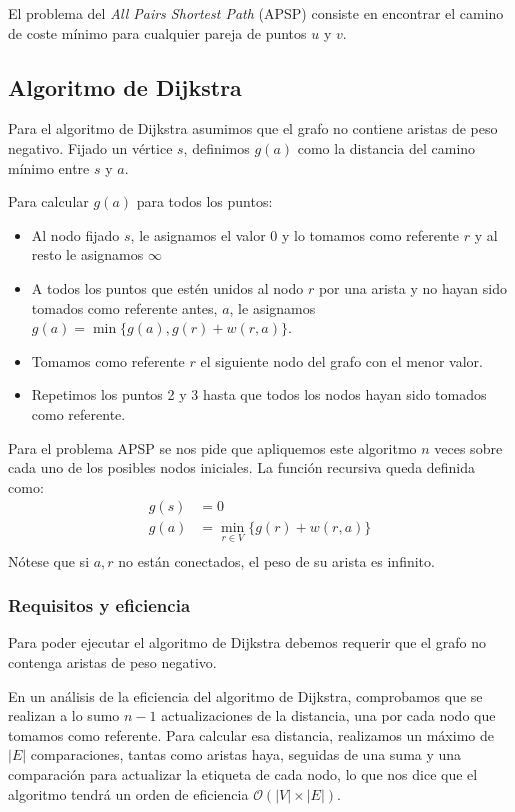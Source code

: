 \documentclass[a4paper, 11pt]{article} %
\begin{document}
    El problema del \textit{All Pairs Shortest Path} (APSP) consiste en encontrar el camino de coste mínimo para cualquier pareja de puntos $u$ y $v$.
    
  \subsection{Algoritmo de Dijkstra}
    Para el algoritmo de Dijkstra asumimos que el grafo no contiene aristas de peso negativo.
    Fijado un vértice $s$, definimos $g(a)$ como la distancia del camino mínimo entre $s$ y $a$.
    
    Para calcular $g(a)$ para todos los puntos:
    \begin{itemize}
      \item Al nodo fijado $s$, le asignamos el valor 0 y lo tomamos como referente $r$ y al resto le asignamos $\infty$
      \item A todos los puntos que estén unidos al nodo $r$  por una
      arista y no hayan sido tomados como referente antes, $a$, le asignamos $g(a) = \min \{g(a), g(r) + w(r,a)\}$.
      \item Tomamos como referente $r$ el siguiente nodo del grafo con el menor valor.
      \item Repetimos los puntos 2 y 3 hasta que todos los nodos hayan sido tomados como referente.
    \end{itemize}
    
    Para el problema APSP se nos pide que apliquemos este algoritmo $n$ veces sobre cada uno
    de los posibles nodos iniciales. La función recursiva queda definida como:
    \begin{equation} 
      \begin{split}
	g(s)  &=  0 \\
	g(a)  &=  \min_{r \in V} \{g(r) + w(r,a)\} \\
      \end{split}
    \end{equation}
    Nótese que si $a,r$ no están conectados, el peso de su arista es infinito.
  
    \subsubsection{Requisitos y eficiencia}
      Para poder ejecutar el algoritmo de Dijkstra debemos requerir que el grafo
      no contenga aristas de peso negativo.
      
      En un análisis de la eficiencia del algoritmo de Dijkstra, comprobamos que se realizan a lo sumo $n-1$ actualizaciones de la distancia, una por cada nodo que tomamos como referente. Para calcular esa distancia, realizamos un máximo de $|E|$ comparaciones, tantas como aristas haya, seguidas de una suma y una comparación para actualizar la etiqueta de cada nodo, lo que nos dice que el algoritmo tendrá un orden de eficiencia $\mathcal{O}(|V|\times |E|)$. 
      
\end{document}

